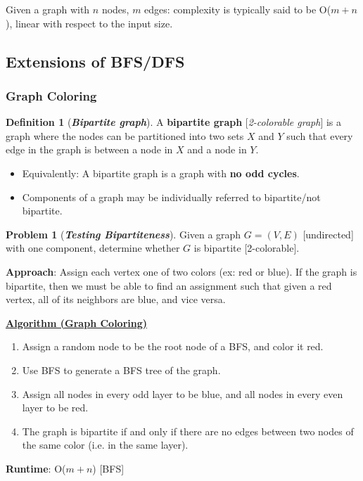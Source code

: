 \documentclass[12pt]{extarticle}
\theoremstyle{definition}
\newtheorem*{definition}{Definition}
\newtheorem*{problem}{Problem}
\theoremstyle{remark}
\newcommand{\probname}[1]{\noindent \textbf{\textit{#1}}}
\newcommand{\probtitle}[1]{\noindent \textbf{\ul{#1}}}
\begin{document}
\noindent Given a graph with $n$ nodes, $m$ edges: complexity is typically said to be O($m+n$), linear with respect to the input size.

\newpage
\subsection{Extensions of BFS/DFS}
\subsubsection{Graph Coloring}
\begin{definition}[\probname{Bipartite graph}]
     A \textbf{bipartite graph} [\textit{2-colorable graph}] is a graph where the nodes can be partitioned into two sets $X$ and $Y$ such that every edge in the graph is between a node in $X$ and a node in $Y$. \begin{itemize}
        \item Equivalently: A bipartite graph is a graph with \textbf{no odd cycles}.
         \item Components of a graph may be individually referred to bipartite/not bipartite.
     \end{itemize}
\end{definition}

\begin{problem}[\probname{Testing Bipartiteness}]
    Given a graph $G=(V,E)$ [undirected] with one component, determine whether $G$ is bipartite [2-colorable].
\end{problem}

\begin{center}
\end{center}

\noindent \textbf{Approach}: Assign each vertex one of two colors (ex: red or blue). If the graph is bipartite, then we must be able to find an assignment such that given a red vertex, all of its neighbors are blue, and vice versa.

\begin{tcolorbox}[colback=red!10!white]
    \probtitle{Algorithm (Graph Coloring)}
    \begin{enumerate}
        \item Assign a random node to be the root node of a BFS, and color it red.
        \item Use BFS to generate a BFS tree of the graph.
        \item Assign all nodes in every odd layer to be blue, and all nodes in every even layer to be red.
        \item The graph is bipartite if and only if there are no edges between two nodes of the same color (i.e. in the same layer).
    \end{enumerate}
    \noindent\textbf{Runtime}: O($m+n$) [BFS]
\end{tcolorbox}
\end{document}
